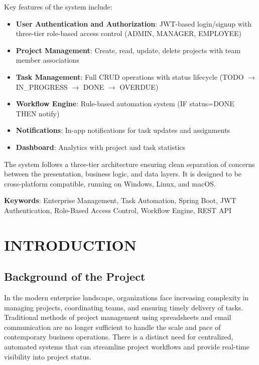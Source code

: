 \documentclass[12pt,a4paper,twoside]{book}
\begin{document}
Key features of the system include:
\begin{itemize}
    \item \textbf{User Authentication and Authorization}: JWT-based login/signup with three-tier role-based access control (ADMIN, MANAGER, EMPLOYEE)
    \item \textbf{Project Management}: Create, read, update, delete projects with team member associations
    \item \textbf{Task Management}: Full CRUD operations with status lifecycle (TODO $\rightarrow$ IN\_PROGRESS $\rightarrow$ DONE $\rightarrow$ OVERDUE)
    \item \textbf{Workflow Engine}: Rule-based automation system (IF status=DONE THEN notify)
    \item \textbf{Notifications}: In-app notifications for task updates and assignments
    \item \textbf{Dashboard}: Analytics with project and task statistics
\end{itemize}

The system follows a three-tier architecture ensuring clean separation of concerns between the presentation, business logic, and data layers. It is designed to be cross-platform compatible, running on Windows, Linux, and macOS.

\bigskip
\textbf{Keywords}: Enterprise Management, Task Automation, Spring Boot, JWT Authentication, Role-Based Access Control, Workflow Engine, REST API

\newpage

\tableofcontents
\thispagestyle{empty}

\newpage
{}
\listoffigures

\newpage
{}
\listoftables


\chapter{INTRODUCTION}

\section{Background of the Project}

In the modern enterprise landscape, organizations face increasing complexity in managing projects, coordinating teams, and ensuring timely delivery of tasks. Traditional methods of project management using spreadsheets and email communication are no longer sufficient to handle the scale and pace of contemporary business operations. There is a distinct need for centralized, automated systems that can streamline project workflows and provide real-time visibility into project status.
\end{document}
